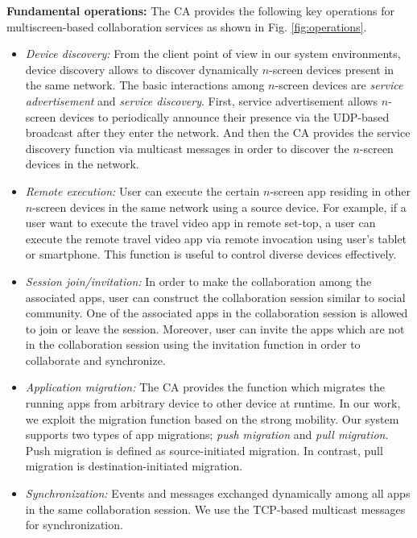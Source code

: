 \documentclass[conference]{IEEEtran}
\newcommand{\bi}{\begin{itemize}}
\newcommand{\ei}{\end{itemize}}
\newcommand{\ii}{\item}
\begin{document}
\noindent
\textbf{Fundamental operations:} 
The CA provides the following key operations for multiscreen-based collaboration services as shown in Fig. \ref{fig:operations}. 
\bi
\ii  \textit{Device discovery:} From the client point of view in our system environments, device discovery allows to discover dynamically $n$-screen devices present in  the same network.
The basic interactions among $n$-screen devices are \textit{service advertisement} and \textit{service discovery}.
First, service advertisement allows $n$-screen devices to periodically announce their presence  via the UDP-based broadcast after they enter the network.  
And then the CA provides the service discovery function via multicast messages in order to discover the $n$-screen devices in the network.
\ii \textit{Remote execution:} User can execute the certain $n$-screen app residing in other $n$-screen devices in the same network using a source device.
For example, if  a user want to execute the travel video app in remote set-top, a user can execute the remote travel video app via remote invocation using user's tablet or smartphone. This function is useful to control diverse devices effectively.
\ii  \textit{Session join/invitation:} In order to make the collaboration among the associated apps, user can construct the collaboration session similar to social community. One of the associated apps in the collaboration session is allowed to join or leave the session. Moreover, user can invite the apps which are not in the collaboration session using the invitation function in order to collaborate and synchronize.
\ii \textit{Application migration:}  The CA provides the function which migrates the running apps from arbitrary device to other device at runtime. In our work, we exploit the migration function based on the strong mobility. Our system supports two types of app migrations; \textit{push migration}  and \textit{pull migration}. Push migration is defined as source-initiated migration. In contrast, pull migration is destination-initiated migration. 
\ii \textit{Synchronization:} Events and messages exchanged dynamically among all apps in the same collaboration session. We use the TCP-based multicast messages for synchronization.
\ei
\end{document}

